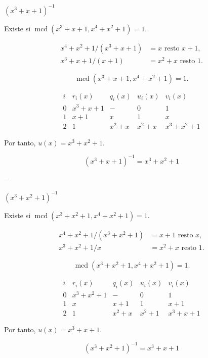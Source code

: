\documentclass[a4paper,12pt]{article}
\begin{document}
\begin{ejercicio}[title=Ejercicio 56]

$(x^3 + x + 1)^{-1}$

Existe si $\operatorname{mcd}(x^3 + x + 1, x^4 + x^2 + 1) = 1$.

\[
\begin{aligned}
x^4 + x^2 + 1 / (x^3 + x + 1) &= x \text{ resto } x + 1, \\
x^3 + x + 1 / (x + 1) &= x^2 + x \text{ resto } \boxed{1}.
\end{aligned}
\]

\[
\operatorname{mcd}(x^3 + x + 1, x^4 + x^2 + 1) = \boxed{1}.
\]

\[
\begin{array}{c|c|c|c|c}
i & r_i(x) & q_i(x) & u_i(x) & v_i(x) \\ \hline
0 & x^3 + x + 1 & - & 0 & 1 \\
1 & x + 1 & x & 1 & x \\
2 & \boxed{1} & x^2 + x & x^2 + x & x^3 + x^2 + 1
\end{array}
\]

Por tanto, $u(x) = x^3 + x^2 + 1$.

\[
\boxed{(x^3 + x + 1)^{-1} = x^3 + x^2 + 1}
\]

---

$(x^3 + x^2 + 1)^{-1}$

Existe si $\operatorname{mcd}(x^3 + x^2 + 1, x^4 + x^2 + 1) = 1$.

\[
\begin{aligned}
x^4 + x^2 + 1 / (x^3 + x^2 + 1) &= x + 1 \text{ resto } x, \\
x^3 + x^2 + 1 / x &= x^2 + x \text{ resto } \boxed{1}.
\end{aligned}
\]

\[
\operatorname{mcd}(x^3 + x^2 + 1, x^4 + x^2 + 1) = 1.
\]

\[
\begin{array}{c|c|c|c|c}
i & r_i(x) & q_i(x) & u_i(x) & v_i(x) \\ \hline
0 & x^3 + x^2 + 1 & - & 0 & 1 \\
1 & x & x + 1 & 1 & x + 1 \\
2 & \boxed{1} & x^2 + x & x^2 + 1 & x^3 + x + 1
\end{array}
\]

Por tanto, $u(x) = x^3 + x + 1$.

\[
\boxed{(x^3 + x^2 + 1)^{-1} = x^3 + x + 1}
\]
\end{ejercicio}
\end{document}

